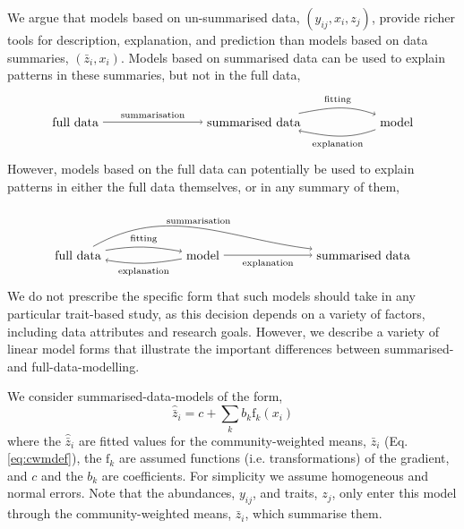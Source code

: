 \documentclass[12pt]{ecology}
\begin{document}
We argue that models based on un-summarised data, $(y_{ij}, x_i, z_j)$, provide richer tools for description, explanation, and prediction than models based on data summaries, $(\bar{z}_i, x_i)$.  Models based on  summarised data can be used to explain patterns in these summaries, but not in the full data,
\begin{equation}
\begin{tikzpicture}
  \node (full) at (0,0) {full data};
  \node (sum) at (5,0) {summarised data};
  \node (mod) at (9,0) {model};
  \draw[->] (full) to node [above]
    {\scriptsize summarisation} (sum);
  \draw[->] (sum) to [out = 11, in = 160] node [above]
    {\scriptsize fitting} (mod);
  \draw[->] (mod) to [out = -160, in = -11] node [below]
    {\scriptsize explanation} (sum);
\end{tikzpicture}
\end{equation}
However, models based on the full data can potentially be used to explain patterns in either the full data themselves, or in any summary of them,
\begin{equation}
\begin{tikzpicture}
  \node (full) at (0,0) {full data};
  \node (mod) at (3.5,0) {model};
  \node (sum) at (8,0) {summarised data};
  \draw[->] (full) to [out = 10, in = 170] node [above] 
    {\scriptsize fitting} (mod);
  \draw[->] (mod) to [out = -170, in = -10] node [below]
    {\scriptsize explanation} (full);
  \draw[->] (full) to [out = 30, in = 173] node [above]
    {\scriptsize summarisation} (sum);
  \draw[->] (mod) to node [below]
    {\scriptsize explanation} (sum);
\end{tikzpicture}
\end{equation}
We do not prescribe the specific form that such models should take in any particular trait-based study, as this decision depends on a variety of factors, including data attributes and research goals.  However, we describe a variety of linear model forms that illustrate the important differences between summarised- and full-data-modelling.

We consider summarised-data-models of the form,
\begin{equation}
\hat{\bar{z}}_i = c + \sum_k b_k \mathrm{f}_k (x_i)
\end{equation}
where the $\hat{\bar{z}}_i$ are fitted values for the community-weighted means, $\bar{z}_i$ (Eq. \ref{eq:cwmdef}), the $\mathrm{f}_k$ are assumed functions (i.e. transformations) of the gradient, and $c$ and the $b_k$ are coefficients.  For simplicity we assume homogeneous and normal errors.  Note that the abundances, $y_{ij}$, and traits, $z_j$, only enter this model through the community-weighted means, $\bar{z}_i$, which summarise them.
\end{document}
